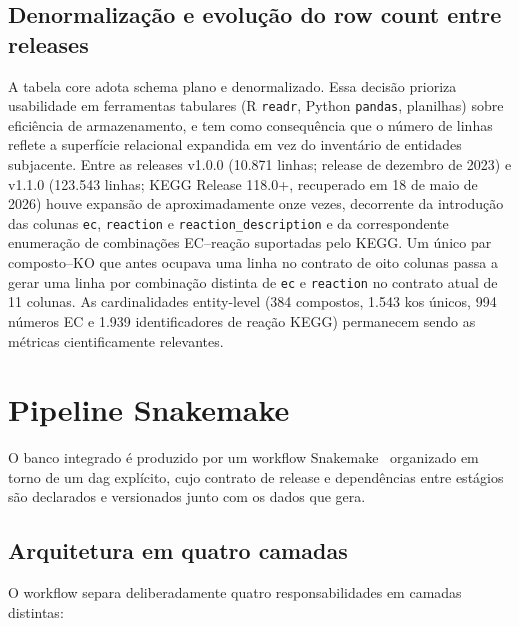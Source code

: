 \subsection{Denormalização e evolução do row count entre releases}

A tabela core adota schema plano e denormalizado. Essa decisão prioriza usabilidade em ferramentas tabulares (R \texttt{readr}, Python \texttt{pandas}, planilhas) sobre eficiência de armazenamento, e tem como consequência que o número de linhas reflete a superfície relacional expandida em vez do inventário de entidades subjacente. Entre as releases v1.0.0 (10.871 linhas; release de dezembro de 2023) e v1.1.0 (123.543 linhas; KEGG Release 118.0+, recuperado em 18 de maio de 2026) houve expansão de aproximadamente onze vezes, decorrente da introdução das colunas \texttt{ec}, \texttt{reaction} e \texttt{reaction\_description} e da correspondente enumeração de combinações EC--reação suportadas pelo KEGG. Um único par composto--KO que antes ocupava uma linha no contrato de oito colunas passa a gerar uma linha por combinação distinta de \texttt{ec} e \texttt{reaction} no contrato atual de 11 colunas. As cardinalidades entity-level (384 compostos, 1.543 \glspl{ko} únicos, 994 números EC e 1.939 identificadores de reação KEGG) permanecem sendo as métricas cientificamente relevantes.

\section{Pipeline Snakemake}
\label{sec:c1-snakemake}

O banco integrado é produzido por um workflow Snakemake~\citep{molder2025snakemake} organizado em torno de um \gls{dag} explícito, cujo contrato de release e dependências entre estágios são declarados e versionados junto com os dados que gera.

\subsection{Arquitetura em quatro camadas}

O workflow separa deliberadamente quatro responsabilidades em camadas distintas:

